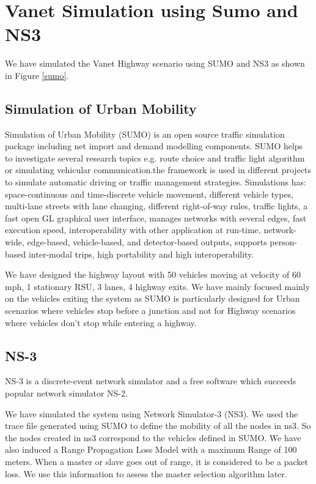 \documentclass{acm_proc_article-sp}
\begin{document}
\section{Vanet Simulation using Sumo and NS3}
\vspace{1 mm}

We have simulated the Vanet Highway scenario using SUMO and NS3 \cite{sumons3} as shown in Figure \ref{sumo}.   

\subsection{Simulation of Urban Mobility}

Simulation of Urban Mobility (SUMO) \cite{sumo} is an open source traffic simulation package including net import and demand modelling components. SUMO helps to investigate several research topics e.g. route choice and traffic light algorithm or simulating vehicular communication.the framework is used in different projects to simulate automatic driving or traffic management strategies. Simulations has: space-continuous and time-discrete vehicle movement, different vehicle types, multi-lane streets with lane changing, different right-of-way rules, traffic lights, a fast open GL graphical user interface, manages networks with several edges, fast execution speed, interoperability with other application at run-time, network-wide, edge-based, vehicle-based, and detector-based outputs, supports person-based inter-modal trips, high portability and high interoperability.

We have designed the highway layout with 50 vehicles moving at velocity of 60 mph, 1 stationary RSU, 3 lanes, 4 highway exits. We have mainly focused mainly on the vehicles exiting the system as SUMO is particularly designed for Urban scenarios where vehicles stop before a junction and not for Highway scenarios where vehicles don't stop while entering a highway.

\subsection{NS-3}

NS-3  \cite{ns} is a discrete-event network simulator and a free software which succeeds popular network simulator NS-2.

We have simulated the system using Network Simulator-3 (NS3). We used the trace file generated using SUMO to define the mobility of all the nodes in ns3. So the nodes created in ns3 correspond to the vehicles defined in SUMO. We have also induced a Range Propagation Loss Model with a maximum Range of 100 meters. When a master or slave goes out of range, it is considered to be a packet loss. We use this information to assess the master selection algorithm later.
\end{document}
